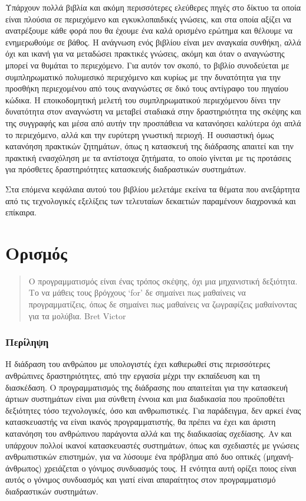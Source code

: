 \documentclass[
]{article}
\begin{document}
Υπάρχουν πολλά βιβλία και ακόμη περισσότερες ελεύθερες πηγές στο δίκτυο
τα οποία είναι πλούσια σε περιεχόμενο και εγκυκλοπαιδικές γνώσεις, και
στα οποία αξίζει να ανατρέξουμε κάθε φορά που θα έχουμε ένα καλά
ορισμένο ερώτημα και θέλουμε να ενημερωθούμε σε βάθος. Η ανάγνωση ενός
βιβλίου είναι μεν αναγκαία συνθήκη, αλλά όχι και ικανή για να μεταδώσει
πρακτικές γνώσεις, ακόμη και όταν ο αναγνώστης μπορεί να θυμάται το
περιεχόμενο. Για αυτόν τον σκοπό, το βιβλίο συνοδεύεται με
συμπληρωματικό πολυμεσικό περιεχόμενο και κυρίως με την δυνατότητα για
την προσθήκη περιεχομένου από τους αναγνώστες σε δικό τους αντίγραφο του
πηγαίου κώδικα. Η εποικοδομητική μελετή του συμπληρωματικού περιεχόμενου
δίνει την δυνατότητα στον αναγνώστη να μεταβεί σταδιακά στην
δραστηριότητα της σκέψης και της συγγραφής και μέσα από αυτήν την
προσπάθεια να κατανόησει καλύτερα όχι απλά το περιεχόμενο, αλλά και την
ευρύτερη γνωστική περιοχή. Η ουσιαστική όμως κατανόηση πρακτικών
ζητημάτων, όπως η κατασκευή της διάδρασης απαιτεί και την πρακτική
ενασχόληση με τα αντίστοιχα ζητήματα, το οποίο γίνεται με τις προτάσεις
για πρόσθετες δραστηριότητες κατασκευής διαδραστικών συστημάτων.

Στα επόμενα κεφάλαια αυτού του βιβλίου μελετάμε εκείνα τα θέματα που
ανεξάρτητα από τις τεχνολογικές εξελίξεις των τελευταίων δεκαετιών
παραμένουν διαχρονικά και επίκαιρα.

\hypertarget{ux3bfux3c1ux3b9ux3c3ux3bcux3ccux3c2}{%
\section{Ορισμός}\label{ux3bfux3c1ux3b9ux3c3ux3bcux3ccux3c2}}

\begin{quote}
Ο προγραμματισμός είναι ένας τρόπος σκέψης, όχι μια μηχανιστική
δεξιότητα. Το να μάθεις τους βρόγχους `for' δε σημαίνει πως μαθαίνεις να
προγραμματίζεις, όπως δε σημαίνει πως μαθαίνεις να ζωγραφίζεις
μαθαίνοντας για τα μολύβια. Bret Victor
\end{quote}

\hypertarget{ux3c0ux3b5ux3c1ux3afux3bbux3b7ux3c8ux3b7}{%
\subsubsection{Περίληψη}\label{ux3c0ux3b5ux3c1ux3afux3bbux3b7ux3c8ux3b7}}

Η διάδραση του ανθρώπου με υπολογιστές έχει καθιερωθεί στις περισσότερες
ανθρώπινες δραστηριότητες, από την εργασία μέχρι την εκπαίδευση και τη
διασκέδαση. Ο προγραμματισμός της διάδρασης που απαιτείται για την
κατασκευή άρτιων συστημάτων είναι μια σύνθετη έννοια και μια διαδικασία
που προϋποθέτει δεξιότητες τόσο τεχνολογικές, όσο και ανθρωπιστικές. Για
παράδειγμα, δεν αρκεί ένας κατασκευαστής να είναι ικανός
προγραμματιστής, θα πρέπει να έχει και άριστη κατανόηση του ανθρώπινου
παράγοντα αλλά και της διαδικασίας σχεδίασης. Αν και υπάρχουν πολλοί
ικανοί κατασκευαστές συστημάτων, όπως και σχεδιαστές με γνώσεις
ανθρωπιστικών επιστημών, για να λύσουμε ένα πρόβλημα από δυο οπτικές
(μηχανή-άνθρωπος) χρειάζεται ο γόνιμος συνδυασμός τους. Η ενότητα αυτή
ορίζει ποιος είναι αυτός ο γόνιμος συνδυασμός και γιατί είναι
απαραίτητος στον προγραμματισμό διαδραστικών συστημάτων.
\end{document}
